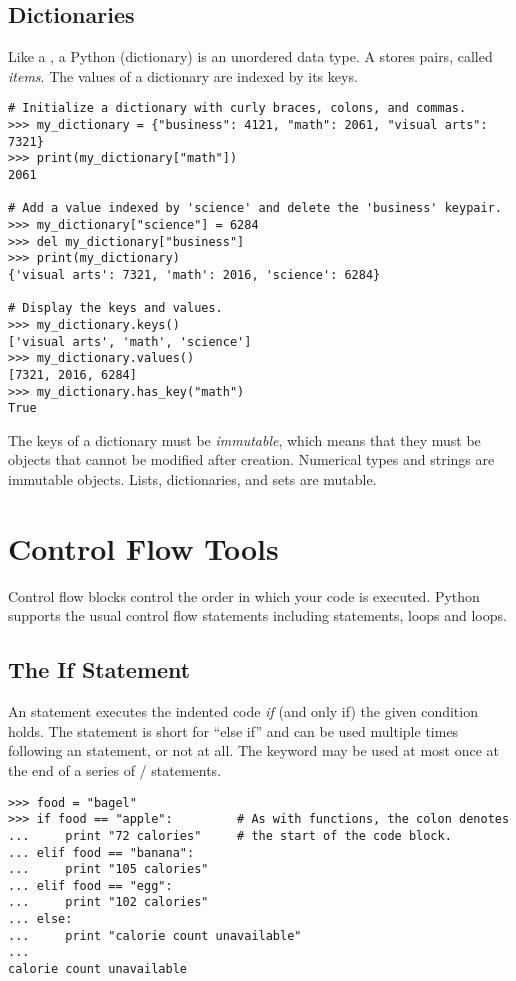 
\subsection*{Dictionaries}
Like a , a Python  (dictionary) is an unordered data type.
A  stores  pairs, called \emph{items}.
The values of a dictionary are indexed by its keys.
\begin{lstlisting}
# Initialize a dictionary with curly braces, colons, and commas.
>>> my_dictionary = {"business": 4121, "math": 2061, "visual arts": 7321} 
>>> print(my_dictionary["math"])
2061

# Add a value indexed by 'science' and delete the 'business' keypair.
>>> my_dictionary["science"] = 6284
>>> del my_dictionary["business"]
>>> print(my_dictionary)
{'visual arts': 7321, 'math': 2016, 'science': 6284}

# Display the keys and values.
>>> my_dictionary.keys()
['visual arts', 'math', 'science']
>>> my_dictionary.values()
[7321, 2016, 6284]
>>> my_dictionary.has_key("math")
True
\end{lstlisting}

The keys of a dictionary must be \emph{immutable}, which means that they must be objects that cannot be modified after creation. Numerical types and strings are immutable objects. Lists, dictionaries, and sets are mutable.


\section*{Control Flow Tools}
Control flow blocks control the order in which your code is executed.
Python supports the usual control flow statements 
including  statements,  loops and  loops. 

\subsection*{The If Statement}
An  statement executes the indented code \emph{if} (and only if) the given condition holds.
The  statement is short for ``else if'' and can be used multiple times following an  statement, or not at all. 
The  keyword may be used at most once at the end of a series of / statements.
\begin{lstlisting}
>>> food = "bagel"         
>>> if food == "apple":         # As with functions, the colon denotes
...     print "72 calories"     # the start of the code block.
... elif food == "banana":
...     print "105 calories"
... elif food == "egg":
...     print "102 calories"
... else: 
...     print "calorie count unavailable"
...     
calorie count unavailable
\end{lstlisting}

